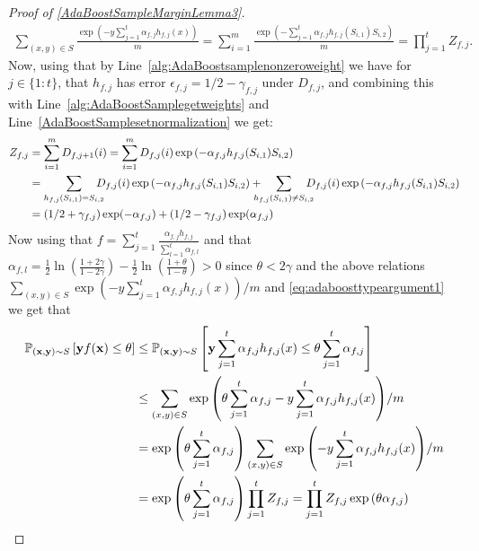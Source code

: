 \begin{proof}[Proof of \cref{AdaBoostSampleMarginLemma3}]
 \begin{align*}
  \sum_{(x,y)\in S} \frac{\exp{\left( -y\sum_{j=1}^{t} \alpha_{f,j}h_{f,j}(x)\right)}}{m} =\sum_{i=1}^{m}\frac{\exp{\left( -\sum_{j=1}^{t}\alpha_{f,j}h_{f,j}(S_{i,1})S_{i,2}\right)}}{m}= \prod_{j=1}^{t}Z_{f,j}.
 \end{align*} 
 Now, using that by Line~\ref{alg:AdaBoostsamplenonzeroweight} we have for $ j\in\{ 1:t \} $,  that $ h_{f,j} $ has error  $ \epsilon_{f,j}=1/2 -\gamma_{f,j}$ under $ D_{f,j} $, and combining this with Line~\ref{alg:AdaBoostSamplegetweights} and Line~\ref{AdaBoostSamplesetnormalization} we get:
    \begin{align}\label{eq:adaboosttypeargument1}
      Z_{f,j}&=\sum_{i=1}^{m} D_{f,j+1}(i)=\sum_{i=1}^{m}D_{f,j}(i) \exp{(-\alpha_{f,j}h_{f,j}(S_{i,1})S_{i,2} )} \\
      &=\sum_{h_{f,j}(S_{i,1})=S_{i,2}}\negmedspace\negmedspace \negmedspace\negmedspace D_{f,j}(i) \exp{(-\alpha_{f,j}h_{f,j}(S_{i,1})S_{i,2} )} +\negmedspace\negmedspace\negmedspace\negmedspace\sum_{h_{f,j}(S_{i,1})\not=S_{i,2}}\negmedspace\negmedspace \negmedspace\negmedspace D_{f,j}(i) \exp{(-\alpha_{f,j}h_{f,j}(S_{i,1})S_{i,2} )}\nonumber\\
      &=(1/2+\gamma_{f,j})\exp(-\alpha_{f,j})+(1/2-\gamma_{f,j})\exp(\alpha_{f,j})\nonumber
    \end{align}          
    Now using that $ f=\sum_{j=1}^{t} \frac{\alpha_{f,j}h_{f,j}}{\sum_{l=1}^{t}{\alpha_{f,l}}} $ and that $ \alpha_{f,l}= \frac{1}{2}\ln{\left(\frac{1+2\gamma}{1-2\gamma}\right)- \frac{1}{2}\ln{\left(\frac{1+\theta}{1-\theta} \right)}}>0$ since $ \theta< 2\gamma $ and the above relations $\sum_{(x,y)\in S}\exp{\left( -y\sum_{j=1}^{t} \alpha_{f,j}h_{f,j}(x)\right)}/m $ and \cref{eq:adaboosttypeargument1} we get that
      \begin{align*}
    \p_{(\rx,\ry)\sim S}\left[\ry f(\rx)\leq \theta \right]
    &\leq 
    \p_{(\rx,\ry)\sim S}\left[\ry \sum_{j=1}^{t} \alpha_{f,j}h_{f,j}(x)\leq \theta\sum_{j=1}^{t}{\alpha_{f,j}} \right]\\
    &\leq
     \sum_{(x,y)\in S}\exp{\left( \theta\sum_{j=1}^{t}{\alpha_{f,j}}-y\sum_{j=1}^{t} \alpha_{f,j}h_{f,j}(x)\right)}/m 
    \\
    &=\exp{\left( \theta\sum_{j=1}^{t}{\alpha_{f,j}}\right)}\sum_{(x,y)\in S}\exp{\left( -y\sum_{j=1}^{t} \alpha_{f,j}h_{f,j}(x)\right)}/m 
    \\
    &=\exp{\left( \theta\sum_{j=1}^{t}{\alpha_{f,j}}\right)}\prod_{j=1}^{t}Z_{f,j}=
    \prod_{j=1}^{t}Z_{f,j}\exp{\left( \theta{\alpha_{f,j}}\right)}

\end{align*}
\end{proof}
